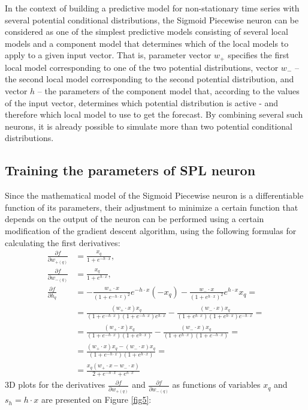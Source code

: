 \documentclass[sn-apa]{sn-jnl}%
\begin{document}
In the context of building a predictive model for non-stationary time series with several potential conditional distributions, the Sigmoid Piecewise neuron can be considered as one of the simplest predictive models consisting of several local models and a component model that determines which of the local models to apply to a given input vector. That is, parameter vector $w_+$ specifies the first local model corresponding to one of the two potential distributions, vector $w_-$ – the second local model corresponding to the second potential distribution, and vector $h$ – the parameters of the component model that, according to the values of the input vector, determines which potential distribution is active - and therefore which local model to use to get the forecast. By combining several such neurons, it is already possible to simulate more than two potential conditional distributions. 
 
\subsection{Training the parameters of SPL neuron}\label{subsec52}
Since the mathematical model of the Sigmoid Piecewise neuron is a differentiable function of its parameters, their adjustment to minimize a certain function that depends on the output of the neuron can be performed using a certain modification of the gradient descent algorithm, using the following formulas for calculating the first derivatives:
\begin{align}
\frac{\partial f}{\partial w_{+(q)}} &= \frac{x_q}{1+e^{-h \cdot x}}, \label{eq13} \\
\frac{\partial f}{\partial w_{-(q)}} &= \frac{x_q}{1+e^{h \cdot x}}, \label{eq14} \\
\frac{\partial f}{\partial h_q} &=-\frac{w_+ \cdot x}{(1+e^{-h \cdot x})^2}e^{-h \cdot x}(-x_q)
	-\frac{w_- \cdot x}{(1+e^{h \cdot x})^2}e^{h \cdot x}x_q= \nonumber \\
 &= \frac{(w_+ \cdot x)x_q}{(1+e^{-h \cdot x})(1+e^{-h \cdot x})e^{h \cdot x}}-
	\frac{(w_- \cdot x)x_q}{(1+e^{h \cdot x})(1+e^{h \cdot x})e^{-h \cdot x}}=  \nonumber \\
 &=\frac{(w_+ \cdot x)x_q}{(1+e^{-h \cdot x})(1+e^{h \cdot x})}-
	\frac{(w_- \cdot x)x_q}{(1+e^{h \cdot x})(1+e^{-h \cdot x})}=  \nonumber \\
 &=\frac{(w_+ \cdot x)x_q - (w_- \cdot x)x_q}{(1+e^{-h \cdot x})(1+e^{h \cdot x})}=  \nonumber \\
& =\frac{x_q(w_+ \cdot x - w_- \cdot x)}{2+e^{-h \cdot x} + e^{h \cdot x}} \label{eq15}
\end{align}
3D plots for the derivatives $\frac{\partial f}{\partial w_{+(q)}}$ and $\frac{\partial f}{\partial w_{-(q)}}$ as functions of variables $x_q$ and $s_h=h \cdot x$ are presented on Figure \ref{fig5}:
\end{document}
